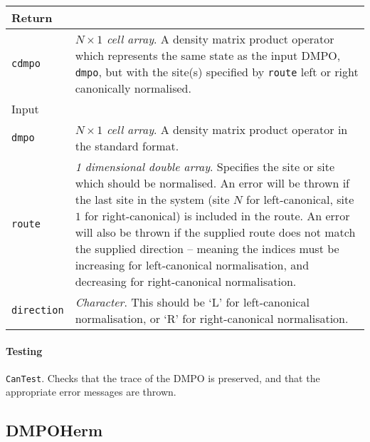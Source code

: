  \begin{longtabu}{X[1,1]X[4,1]}
 \hline
 Return & \\ \hline
 \lstinline$cdmpo$ & \emph{\(N \times 1\) cell array}. A density matrix product operator which represents the same state as the input DMPO, \lstinline$dmpo$, but with the site(s) specified by \lstinline$route$ left or right canonically normalised. \\ \hline
 Input & \\ \hline
 \lstinline$dmpo$ & \emph{\(N \times 1\) cell array}. A density matrix product operator in the standard format. \\
 \lstinline$route$ & \emph{1 dimensional double array}. Specifies the site or site which should be normalised. An error will be thrown if the last site in the system (site \(N\) for left-canonical, site \(1\) for right-canonical) is included in the route. An error will also be thrown if the supplied route does not match the supplied direction -- meaning the indices must be increasing for left-canonical normalisation, and decreasing for right-canonical normalisation. \\
 \lstinline$direction$ & \emph{Character}. This should be `L' for left-canonical normalisation, or `R' for right-canonical normalisation. \\
 \hline
 \end{longtabu}
 \paragraph{Testing} \lstinline$CanTest$. Checks that the trace of the DMPO is preserved, and that the appropriate error messages are thrown.

 \subsection{DMPOHerm}
